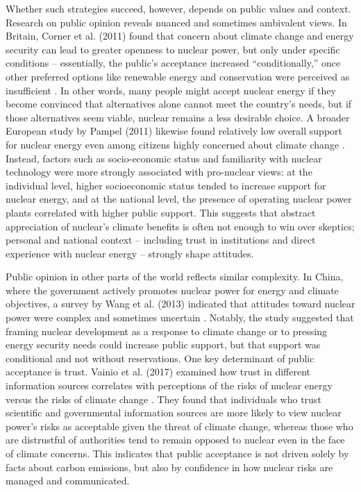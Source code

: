 \documentclass[11,5 pt]{article}
\begin{document}
Whether such strategies succeed, however, depends on public values and context. Research on public opinion reveals nuanced and sometimes ambivalent views. In Britain, Corner et al. (2011) found that concern about climate change and energy security can lead to greater openness to nuclear power, but only under specific conditions – essentially, the public’s acceptance increased “conditionally,” once other preferred options like renewable energy and conservation were perceived as insufficient \cite{CORNER20114823}. In other words, many people might accept nuclear energy if they become convinced that alternatives alone cannot meet the country’s needs, but if those alternatives seem viable, nuclear remains a less desirable choice. A broader European study by Pampel (2011) likewise found relatively low overall support for nuclear energy even among citizens highly concerned about climate change \cite{Pampel}. Instead, factors such as socio-economic status and familiarity with nuclear technology were more strongly associated with pro-nuclear views: at the individual level, higher socioeconomic status tended to increase support for nuclear energy, and at the national level, the presence of operating nuclear power plants correlated with higher public support. This suggests that abstract appreciation of nuclear’s climate benefits is often not enough to win over skeptics; personal and national context – including trust in institutions and direct experience with nuclear energy – strongly shape attitudes.

Public opinion in other parts of the world reflects similar complexity. In China, where the government actively promotes nuclear power for energy and climate objectives, a survey by Wang et al. (2013) indicated that attitudes toward nuclear power were complex and sometimes uncertain \cite{wang2013impact}. Notably, the study suggested that framing nuclear development as a response to climate change or to pressing energy security needs could increase public support, but that support was conditional and not without reservations. One key determinant of public acceptance is trust. Vainio et al. (2017) examined how trust in different information sources correlates with perceptions of the risks of nuclear energy versus the risks of climate change \cite{Vainio2017WeighingTR}. They found that individuals who trust scientific and governmental information sources are more likely to view nuclear power’s risks as acceptable given the threat of climate change, whereas those who are distrustful of authorities tend to remain opposed to nuclear even in the face of climate concerns. This indicates that public acceptance is not driven solely by facts about carbon emissions, but also by confidence in how nuclear risks are managed and communicated.
\end{document}
